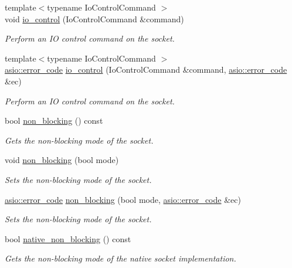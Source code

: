 \begin{DoxyCompactItemize}
{\footnotesize template$<$typename Io\+Control\+Command $>$ }\\void \hyperlink{classasio_1_1basic__socket_af5063d5f786774905178c9e0af6339b8}{io\+\_\+control} (Io\+Control\+Command \&command)
\begin{DoxyCompactList}\small\item\em Perform an I\+O control command on the socket. \end{DoxyCompactList}\item 
{\footnotesize template$<$typename Io\+Control\+Command $>$ }\\\hyperlink{classasio_1_1error__code}{asio\+::error\+\_\+code} \hyperlink{classasio_1_1basic__socket_a866b104328c059282f30db27ff167153}{io\+\_\+control} (Io\+Control\+Command \&command, \hyperlink{classasio_1_1error__code}{asio\+::error\+\_\+code} \&ec)
\begin{DoxyCompactList}\small\item\em Perform an I\+O control command on the socket. \end{DoxyCompactList}\item 
bool \hyperlink{classasio_1_1basic__socket_ae8881aa0b691d6be1f71424140cf84e7}{non\+\_\+blocking} () const 
\begin{DoxyCompactList}\small\item\em Gets the non-\/blocking mode of the socket. \end{DoxyCompactList}\item 
void \hyperlink{classasio_1_1basic__socket_a04e6858ccb5969833ebbe517e48bb5bc}{non\+\_\+blocking} (bool mode)
\begin{DoxyCompactList}\small\item\em Sets the non-\/blocking mode of the socket. \end{DoxyCompactList}\item 
\hyperlink{classasio_1_1error__code}{asio\+::error\+\_\+code} \hyperlink{classasio_1_1basic__socket_af72c3fe3e5b8207caed06361bbe24e19}{non\+\_\+blocking} (bool mode, \hyperlink{classasio_1_1error__code}{asio\+::error\+\_\+code} \&ec)
\begin{DoxyCompactList}\small\item\em Sets the non-\/blocking mode of the socket. \end{DoxyCompactList}\item 
bool \hyperlink{classasio_1_1basic__socket_aa503a72fd1503bca928120cd90e12ebb}{native\+\_\+non\+\_\+blocking} () const 
\begin{DoxyCompactList}\small\item\em Gets the non-\/blocking mode of the native socket implementation. \end{DoxyCompactList}\item 

\end{DoxyCompactItemize}
